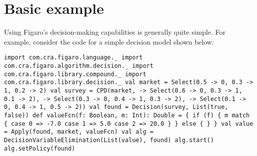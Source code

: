\section{Basic example}

Using Figaro's decision-making capabilities is generally quite simple. For example, consider the code for a simple decision model shown below:

\begin{flushleft}
\texttt{import com.cra.figaro.language.\_
\newline import com.cra.figaro.algorithm.decision.\_
\newline import com.cra.figaro.library.compound.\_
\newline import com.cra.figaro.library.decision.\_ 
\newline 
\newline val market = Select(0.5 -> 0, 0.3 -> 1, 0.2 -> 2)
\newline val survey = CPD(market, 
\newline {} -> Select(0.6 -> 0, 0.3 -> 1, 0.1 -> 2),
\newline {} -> Select(0.3 -> 0, 0.4 -> 1, 0.3 -> 2),
\newline {} -> Select(0.1 -> 0, 0.4 -> 1, 0.5 -> 2))
\newline 
\newline val found = Decision(survey, List(true, false))
\newline 
\newline def valueFcn(f: Boolean, m: Int): Double = \{
\newline \tab if (f) \{
\newline \tab m match \{
\newline \tab case 0 => -7.0 
\newline \tab case 1 => 5.0 
\newline \tab case 2 => 20.0
\newline \}
\newline \} else \{
\newline{}
\newline \}
\newline \}
\newline 
\newline val value = Apply(found, market, valueFcn)
\newline 
\newline val alg = DecisionVariableElimination(List(value), found)
\newline alg.start()
\newline alg.setPolicy(found)
}
\end{flushleft}

